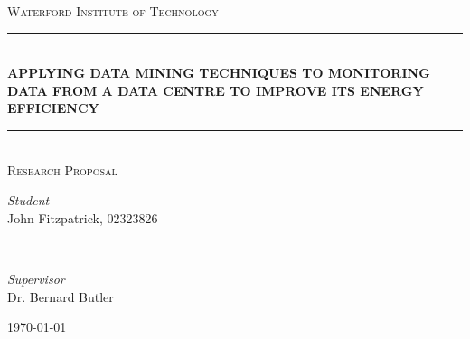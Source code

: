 \documentclass[12pt]{scrartcl}
\begin{document}
\begin{titlepage}
	\newcommand{\HRule}{\rule{\linewidth}{0.5mm}}

	\center
	\textsc{\LARGE Waterford Institute of Technology}\\[1.5cm]
	\HRule\\[0.4cm]

	\huge\bfseries \MakeTextUppercase{Applying Data Mining Techniques to Monitoring Data from a Data Centre to Improve its Energy Efficiency}\\[0.4cm]

	\HRule\\[1.0cm]
	\textsc{\large Research Proposal}\\[1.5cm]
	\begin{minipage}{0.4\textwidth}
		\begin{flushleft}
			\large
			\textit{Student}\\
			John Fitzpatrick, 02323826
		\end{flushleft}
	\end{minipage}
	~
	\begin{minipage}{0.4\textwidth}
		\begin{flushright}
			\large
			\textit{Supervisor}\\
      Dr. Bernard Butler
		\end{flushright}
	\end{minipage}


	\vfill\vfill\vfill

	{\large\today}

	\vfill

\end{titlepage}

\newpage
{}
\tableofcontents
\newpage
\listoffigures
\newpage
\lstlistoflistings %
\newpage
{}




\end{document}
